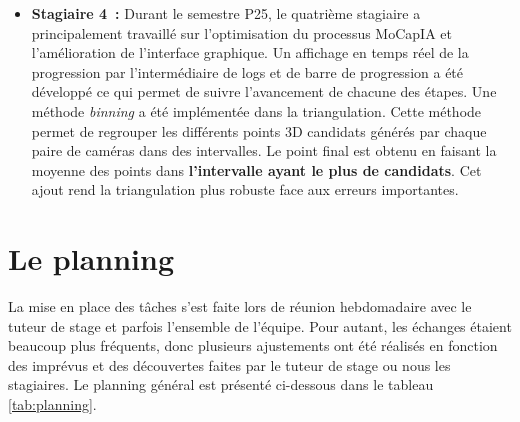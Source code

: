 \begin{itemize}
            \item \textbf{Stagiaire 4 :} Durant le semestre P25, le quatrième stagiaire a principalement travaillé sur l'optimisation du processus MoCapIA et l'amélioration de l'interface graphique. Un affichage en temps réel de la progression par l'intermédiaire de logs et de barre de progression a été développé ce qui permet de suivre l'avancement de chacune des étapes. 
            Une méthode \textit{binning} a été implémentée dans la triangulation. Cette méthode permet de regrouper les différents points 3D candidats générés par chaque paire de caméras dans des intervalles. Le point final est obtenu en faisant la moyenne des points dans \textbf{l'intervalle ayant le plus de candidats}. Cet ajout rend la triangulation plus robuste face aux erreurs importantes. 
        \end{itemize}

\section{Le planning}

    La mise en place des tâches s'est faite lors de réunion hebdomadaire avec le tuteur de stage et parfois l'ensemble de l'équipe. Pour autant, les échanges étaient beaucoup plus fréquents, donc plusieurs ajustements ont été réalisés en fonction des imprévus et des découvertes faites par le tuteur de stage ou nous les stagiaires. Le planning général est présenté ci-dessous dans le tableau \ref{tab:planning}.

